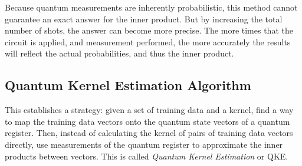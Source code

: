 \documentclass[%
 reprint,
nofootinbib,
 amsmath,amssymb,
 aps,
]{revtex4-2}
\begin{document}

Because quantum measurements are inherently probabilistic, this method cannot guarantee an exact answer for the inner product. But by increasing the total number of shots, the answer can become more precise. The more times that the circuit is applied, and measurement performed, the more accurately the results will reflect the actual probabilities, and thus the inner product.

\subsection{Quantum Kernel Estimation Algorithm}

This establishes a strategy: given a set of training data and a kernel, find a way to map the training data vectors onto the quantum state vectors of a quantum register. Then, instead of calculating the kernel of pairs of training data vectors directly, use measurements of the quantum register to approximate the inner products between vectors. This is called \textit{Quantum Kernel Estimation} or QKE.
\end{document}
